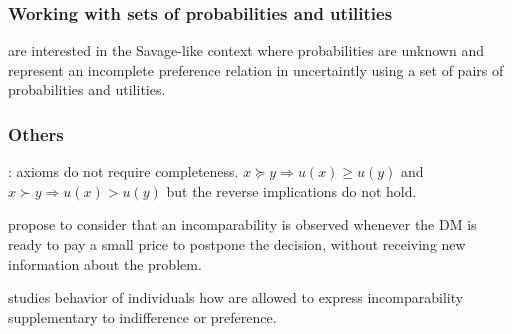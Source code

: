 \documentclass[french, english]{llncs}
\begin{document}
	\subsubsection{Working with sets of probabilities and utilities}
	
	\citet{galaabaatar_subjective_2013} are interested in the Savage-like context where probabilities are unknown and represent an incomplete preference relation in uncertaintly using a set of pairs of probabilities and utilities.
	
	\subsubsection{Others}
	\citet{aumann_utility_1962}: axioms do not require completeness. $x \succeq y ⇒ u(x) ≥ u(y)$ and $x \succ y ⇒ u(x) > u(y)$ but the reverse implications do not hold.

	\citet{danan_are_2006} propose to consider that an incomparability is observed whenever the \ac{DM} is ready to pay a small price to postpone the decision, without receiving new information about the problem.
	
\citet{deparis_when_2012} studies behavior of individuals how are allowed to express incomparability supplementary to indifference or preference.
\end{document}
